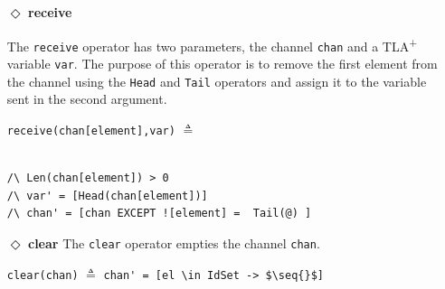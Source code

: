 \documentclass{thesul}
\newcommand{\tlaplus}{TLA\textsuperscript{+}\xspace}
\newcommand{\seq}[1]{\langle #1 \rangle}
\begin{document}
\begin{itemize}
\begin{minipage}{.44\textwidth}

\lstinline!multicast(chan, [a \in sub |-> msg])! $\triangleq$\\\\\\
\end{minipage}\hfill
\begin{minipage}{.6\textwidth}
\begin{lstlisting}[frame = none, numbers = none]
chan'=[a \in DOMAIN chan 
			|-> IF a \in sub 
       THEN Append(chan[a], msg)
       ELSE chan[a]]
\end{lstlisting}

\end{minipage}\hfill


\item[$\Diamond$]  \textbf{receive}

The \verb|receive| operator has two parameters, the channel \verb|chan| and a \tlaplus variable \verb|var|. The purpose of this operator is to remove the first element from the channel using the \verb|Head| and \verb|Tail| operators and assign it to the variable sent in the second argument.

\begin{minipage}{.3\textwidth}

\lstinline|receive(chan[element],var)| $\triangleq$\\\\
\end{minipage}\hfill
\begin{minipage}{.7\textwidth}
\begin{lstlisting}[frame = none, numbers = none]
/\ Len(chan[element]) > 0 
/\ var' = [Head(chan[element])]
/\ chan' = [chan EXCEPT ![element] =  Tail(@) ]
\end{lstlisting}

\end{minipage}\hfill

\item[$\Diamond$]  \textbf{clear}
The \verb|clear| operator empties the channel \verb|chan|.

\begin{center}

\lstinline|clear(chan)| $\triangleq$
\lstinline[mathescape]|chan' = [el \in IdSet -> $\seq{}$]|

\end{center}
\end{itemize}
\end{document}
